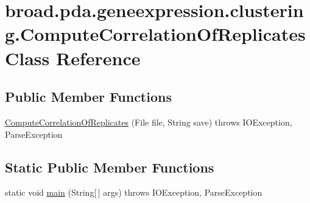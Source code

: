 \hypertarget{classbroad_1_1pda_1_1geneexpression_1_1clustering_1_1_compute_correlation_of_replicates}{\section{broad.\+pda.\+geneexpression.\+clustering.\+Compute\+Correlation\+Of\+Replicates Class Reference}
\label{classbroad_1_1pda_1_1geneexpression_1_1clustering_1_1_compute_correlation_of_replicates}
}
\subsection*{Public Member Functions}
\begin{DoxyCompactItemize}
\item 
\hyperlink{classbroad_1_1pda_1_1geneexpression_1_1clustering_1_1_compute_correlation_of_replicates_a8a2c2ac12a1cdf0a1457b8f9bd597cb9}{Compute\+Correlation\+Of\+Replicates} (File file, String save)  throws I\+O\+Exception, Parse\+Exception
\end{DoxyCompactItemize}
\subsection*{Static Public Member Functions}
\begin{DoxyCompactItemize}
\item 
static void \hyperlink{classbroad_1_1pda_1_1geneexpression_1_1clustering_1_1_compute_correlation_of_replicates_aca4d392c129c922d844cd2d916d7d8a2}{main} (String\mbox{[}$\,$\mbox{]} args)  throws I\+O\+Exception, Parse\+Exception
\end{DoxyCompactItemize}


